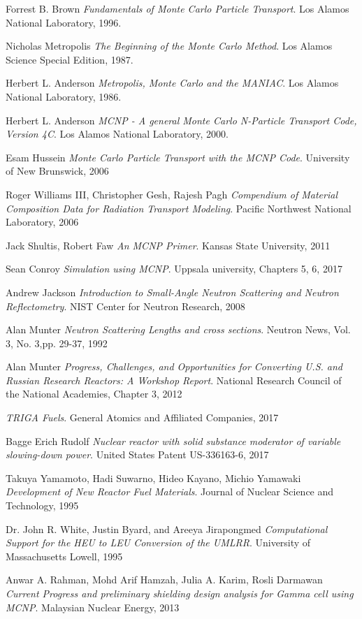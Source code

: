 \label{sec:bibliography}
\begin{thebibliography}{9}
Forrest B. Brown 
\textit{Fundamentals of Monte Carlo Particle Transport}.
Los Alamos National Laboratory, 1996.
 
Nicholas Metropolis
\textit{The Beginning of the Monte Carlo Method}.
Los Alamos Science Special Edition, 1987.
 
Herbert L. Anderson
\textit{Metropolis, Monte Carlo and the MANIAC}.
Los Alamos National Laboratory, 1986.

Herbert L. Anderson
\textit{MCNP - A general Monte Carlo N-Particle Transport Code, Version 4C}.
Los Alamos National Laboratory, 2000.

Esam Hussein
\textit{Monte Carlo Particle Transport with the MCNP Code}.
University of New Brunswick, 2006

Roger Williams III, Christopher Gesh, Rajesh Pagh
\textit{Compendium of Material Composition Data for Radiation Transport Modeling}.
Pacific Northwest National Laboratory, 2006

Jack Shultis, Robert Faw
\textit{An MCNP Primer}.
Kansas State University, 2011

Sean Conroy
\textit{Simulation using MCNP}.
Uppsala university, Chapters 5, 6, 2017

Andrew Jackson
\textit{Introduction to Small-Angle Neutron Scattering and Neutron Reflectometry}.
NIST Center for Neutron Research, 2008

Alan Munter
\textit{Neutron Scattering Lengths and cross sections}.
Neutron News, Vol. 3, No. 3,pp. 29-37, 1992

Alan Munter
\textit{Progress, Challenges, and Opportunities for Converting U.S. and Russian Research Reactors: A Workshop Report}.
National Research Council of the National Academies, Chapter 3, 2012

\textit{TRIGA Fuels}.
General Atomics and Affiliated Companies, 2017

Bagge Erich Rudolf
\textit{Nuclear reactor with solid substance moderator of variable slowing-down power}.
United States Patent US-336163-6, 2017

Takuya Yamamoto, Hadi Suwarno, Hideo Kayano, Michio Yamawaki
\textit{Development of New Reactor Fuel Materials}.
Journal of Nuclear Science and Technology, 1995

Dr. John R. White, Justin Byard, and Areeya Jirapongmed 
\textit{Computational Support for the HEU to LEU Conversion of the UMLRR}.
University of Massachusetts Lowell, 1995

Anwar A. Rahman, Mohd Arif Hamzah, Julia A. Karim, Rosli Darmawan
\textit{Current Progress and preliminary shielding design analysis for Gamma cell using MCNP}.
Malaysian Nuclear Energy, 2013
\end{thebibliography}